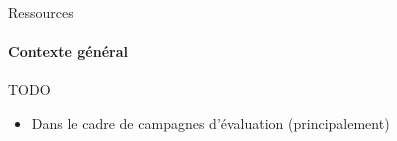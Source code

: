 \begin{frame}{Ressources}\framesubtitle{Contexte général}
  \begin{alertblock}{TODO}
    \begin{itemize}
      \item{Dans le cadre de campagnes d'évaluation (principalement)}
    \end{itemize}
  \end{alertblock}
\end{frame}

